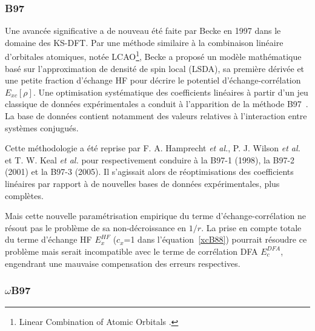 	
	\subsubsection{B97}
	
	Une avancée significative a de nouveau été faite par Becke en 1997 dans le domaine des KS-DFT. Par une méthode similaire à la combinaison linéaire d'orbitales atomiques, notée LCAO\footnote{\og Linear Combination of Atomic Orbitals \fg{}.}, Becke a proposé un modèle mathématique basé sur l'approximation de densité de spin local (LSDA), sa première dérivée et une petite fraction d'échange HF pour décrire le potentiel d'échange-corrélation $E_{xc}[\rho]$. Une optimisation systématique des coefficients linéaires à partir d'un jeu classique de données expérimentales a conduit à l'apparition de la méthode B97~\cite{becke1997density}. La base de données contient notamment des valeurs relatives à l'interaction entre systèmes conjugués.
	
	Cette méthodologie a été reprise par F. A. Hamprecht \textit{et al.}, P. J. Wilson \textit{et al.} et T. W. Keal \textit{et al.} pour respectivement conduire à la B97-1 \cite{hamprecht1998development} (1998), la B97-2 \cite{wilson2001hybrid} (2001) et la B97-3 \cite{keal2005semiempirical} (2005). Il s'agissait alors de réoptimisations des coefficients linéaires par rapport à de nouvelles bases de données expérimentales, plus complètes.
	
	Mais cette nouvelle paramétrisation empirique du terme d'échange-corrélation ne résout pas le problème de sa non-décroissance en $1/r$. La prise en compte totale du terme d'échange HF $E_{x}^{HF}$ ($c_{x}$=1 dans l'équation~\ref{xcB88}) pourrait résoudre ce problème mais serait incompatible avec le terme de corrélation DFA $E_{c}^{DFA}$, engendrant une mauvaise compensation des erreurs respectives.
	
	\subsubsection{$\omega$B97}
	
